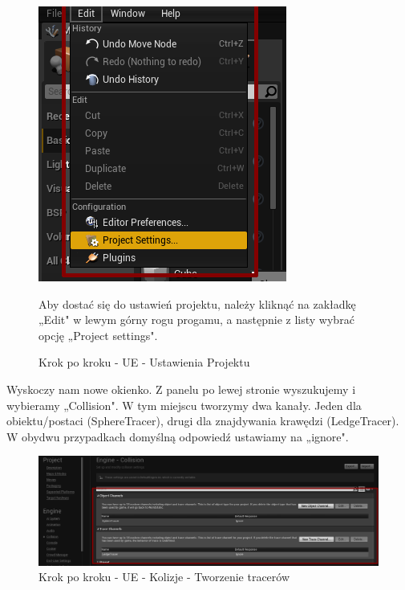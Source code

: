 \documentclass[12pt]{xmgr}
\begin{document}
\begin{figure}[!htb]
    \begin{center}
    \includegraphics[scale=0.5]{Screeny/UeKrokPoKroku/UE-Climb-ProjectSettings.png}
    \end{center}
    \caption{Krok po kroku - UE - Ustawienia Projektu}
    Aby dostać się do ustawień projektu, należy kliknąć na zakładkę „Edit" w lewym górny rogu progamu, a następnie z listy wybrać opcję „Project settings".
\end{figure}

Wyskoczy nam nowe okienko. Z panelu po lewej stronie wyszukujemy i wybieramy „Collision". W tym miejscu tworzymy dwa kanały. Jeden dla obiektu/postaci (SphereTracer), drugi dla znajdywania krawędzi (LedgeTracer). W obydwu przypadkach domyślną odpowiedź ustawiamy na „ignore".

\begin{figure}[!htb]
    \begin{center}
    \includegraphics[scale=0.35]{Screeny/UeKrokPoKroku/UE-Climb-Collision.png}
    \end{center}
    \caption{Krok po kroku - UE -  Kolizje - Tworzenie tracerów}
\end{figure}
\end{document}

